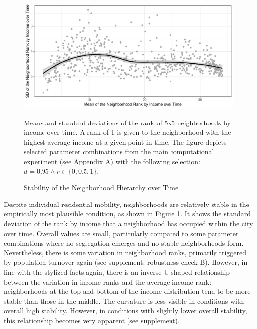 \documentclass[a4paper,12pt]{article}
\begin{document}
\begin{figure}
\caption{Stability of the Neighborhood Hierarchy over Time}
\includegraphics[width=\textwidth]{./images/abm_02b_nbstability}

\tiny{Means and standard deviations of the rank of 5x5 neighborhoods by income over time. A rank of 1 is given to the neighborhood with the highest average income at a given point in time. The figure depicts selected parameter combinations from the main computational experiment (see Appendix A) with the following selection: $d = 0.95 \land r \in \{0, 0.5, 1\}$.} 
\label{fig:stab}
\end{figure}

Despite individual residential mobility, neighborhoods are relatively stable in the empirically most plausible condition, as shown in Figure \ref{fig:stab}. It shows the standard deviation of the rank by income that a neighborhood has occupied within the city over time. Overall values are small, particularly compared to some parameter combinations where no segregation emerges and no stable neighborhoods form. Nevertheless, there is some variation in neighborhood ranks, primarily triggered by population turnover again (see supplement: robustness check B). However, in line with the stylized facts again, there is an inverse-U-shaped relationship between the variation in income ranks and the average income rank: neighborhoods at the top and bottom of the income distribution tend to be more stable than those in the middle. The curvature is less visible in conditions with overall high stability. However, in conditions with slightly lower overall stability, this relationship becomes very apparent (see supplement).
\end{document}
